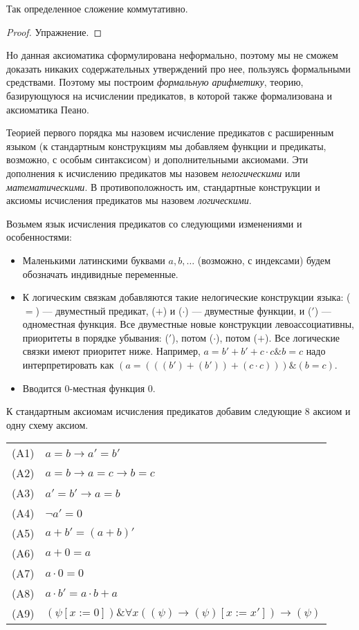 \begin{theorem}Так определенное сложение коммутативно.
\end{theorem}
\begin{proof}Упражнение.\end{proof}

Но данная аксиоматика сформулирована неформально, поэтому мы не сможем
доказать никаких содержательных утверждений про нее, пользуясь формальными
средствами. Поэтому мы построим \emph{формальную арифметику}, теорию,
базирующуюся на исчислении предикатов, в которой также формализована и
аксиоматика Пеано.

\begin{definition}Теорией первого порядка мы назовем исчисление предикатов
с расширенным языком (к стандартным конструкциям мы добавляем функции и 
предикаты, возможно, с особым синтаксисом) и дополнительными аксиомами. 
Эти дополнения к исчислению предикатов мы назовем \emph{нелогическими} или 
\emph{математическими}. В противоположность им, стандартные конструкции и 
аксиомы исчисления предикатов мы назовем \emph{логическими}.
\end{definition}

Возьмем язык исчисления предикатов со следующими изменениями и особенностями:

\begin{itemize}
\item Маленькими латинскими буквами $a,b,\dots$ (возможно, с индексами) будем 
обозначать индивидные переменные. 
\item К логическим связкам добавляются такие нелогические конструкции языка: 
($=$) --- двуместный предикат, ($+$) и ($\cdot$) --- двуместные функции, и 
($'$) --- одноместная функция. Все двуместные новые конструкции левоассоциативны, 
приоритеты в порядке убывания: ($'$), потом ($\cdot$), потом ($+$). 
Все логические связки имеют приоритет ниже. Например, $a= b'+b'+c \cdot c \& b = c$ 
надо интерпретировать как $(a = (((b') + (b')) + (c \cdot c))) \& (b = c)$.
\item Вводится 0-местная функция $0$.
\end{itemize}

К стандартным аксиомам исчисления предикатов добавим следующие 8 аксиом и одну схему аксиом.

\begin{tabular}{ll}
(A1) & $a = b \rightarrow a' = b'$\\
(A2) & $a = b \rightarrow a = c \rightarrow b = c$\\
(A3) & $a' = b' \rightarrow a = b$\\
(A4) & $\neg a' = 0$\\
(A5) & $a + b' = (a+b)'$\\
(A6) & $a + 0 = a$\\
(A7) & $a \cdot 0 = 0$\\
(A8) & $a \cdot b' = a \cdot b + a$\\
(A9) & $(\psi [x := 0]) \& \forall{x}((\psi) \rightarrow (\psi) [x := x']) \rightarrow (\psi)$
\end{tabular}

